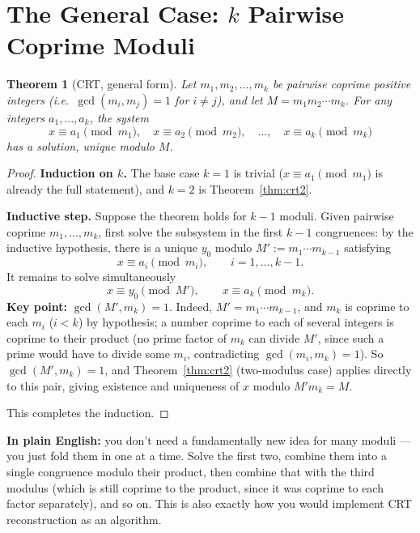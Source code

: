 \documentclass[11pt]{article}
\newtheorem{theorem}{Theorem}[section]
\theoremstyle{definition}
\theoremstyle{remark}
\begin{document}
\section{The General Case: $k$ Pairwise Coprime Moduli}

\begin{theorem}[CRT, general form]\label{thm:crtgeneral}
Let $m_1, m_2, \dots, m_k$ be pairwise coprime positive integers (i.e.\ $\gcd(m_i,m_j)=1$ for $i\ne j$), and let $M = m_1 m_2 \cdots m_k$. For any integers $a_1,\dots,a_k$, the system
\[
x \equiv a_1 \pmod{m_1}, \quad x \equiv a_2 \pmod{m_2}, \quad \dots, \quad x \equiv a_k \pmod{m_k}
\]
has a solution, unique modulo $M$.
\end{theorem}

\begin{proof}
\textbf{Induction on $k$.} The base case $k=1$ is trivial ($x\equiv a_1 \pmod {m_1}$ is already the full statement), and $k=2$ is Theorem~\ref{thm:crt2}.

\textbf{Inductive step.} Suppose the theorem holds for $k-1$ moduli. Given pairwise coprime $m_1,\dots,m_k$, first solve the subsystem in the first $k-1$ congruences: by the inductive hypothesis, there is a unique $y_0$ modulo $M' := m_1\cdots m_{k-1}$ satisfying
\[
x \equiv a_i \pmod{m_i}, \qquad i=1,\dots,k-1.
\]
It remains to solve simultaneously
\[
x \equiv y_0 \pmod{M'}, \qquad x \equiv a_k \pmod{m_k}.
\]
\textbf{Key point:} $\gcd(M', m_k) = 1$. Indeed, $M' = m_1\cdots m_{k-1}$, and $m_k$ is coprime to each $m_i$ ($i<k$) by hypothesis; a number coprime to each of several integers is coprime to their product (no prime factor of $m_k$ can divide $M'$, since such a prime would have to divide some $m_i$, contradicting $\gcd(m_i,m_k)=1$). So $\gcd(M',m_k)=1$, and Theorem~\ref{thm:crt2} (two-modulus case) applies directly to this pair, giving existence and uniqueness of $x$ modulo $M'm_k = M$.

This completes the induction.
\end{proof}

\noindent\textbf{In plain English:} you don't need a fundamentally new idea for many moduli — you just fold them in one at a time. Solve the first two, combine them into a single congruence modulo their product, then combine that with the third modulus (which is still coprime to the product, since it was coprime to each factor separately), and so on. This is also exactly how you would implement CRT reconstruction as an algorithm.
\end{document}
